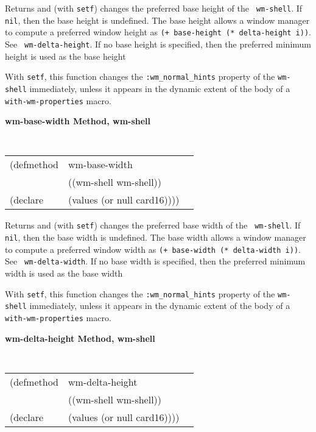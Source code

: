 \begin{flushright} \parbox[t]{6.125in}{
Returns and (with {\tt setf}) changes the preferred base height of the {\tt
wm-shell}.
If {\tt nil}, then the base height is undefined. The base height allows a window manager
to compute
a preferred window height as {\tt (+ base-height (* delta-height i))}. See {\tt
wm-delta-height}.
If no base height is specified, then the preferred minimum height is used as the
base height

With {\tt setf}, this function changes the {\tt :wm\_normal\_hints} property of
the {\tt wm-shell} immediately, unless it appears in the dynamic extent of the
body of a {\tt with-wm-properties} macro.

 }\end{flushright}

{\samepage
{\large {\bf wm-base-width \hfill Method, wm-shell}}
\begin{flushright} \parbox[t]{6.125in}{
\tt
\begin{tabular}{lll}
\raggedright
(defmethod & wm-base-width & \\
           & ((wm-shell  wm-shell)) \\
(declare   & (values (or null card16))))
\end{tabular}
\rm

}\end{flushright}}

\begin{flushright} \parbox[t]{6.125in}{
Returns and (with {\tt setf}) changes the preferred base width of the {\tt
wm-shell}. If {\tt nil}, then the base width is undefined. The base width allows a window
manager to compute a preferred window
width as {\tt (+ base-width (* delta-width i))}. See {\tt
wm-delta-width}.
If no base width is specified, then the preferred minimum width is used as the
base width

With {\tt setf}, this function changes the {\tt :wm\_normal\_hints} property of
the {\tt wm-shell} immediately, unless it appears in the dynamic extent of the
body of a {\tt with-wm-properties} macro.

}\end{flushright}

{\samepage
{\large {\bf wm-delta-height \hfill Method, wm-shell}}
\begin{flushright} \parbox[t]{6.125in}{
\tt
\begin{tabular}{lll}
\raggedright
(defmethod & wm-delta-height & \\
           & ((wm-shell  wm-shell)) \\
(declare   & (values (or null card16))))
\end{tabular}
\rm

}\end{flushright}}

